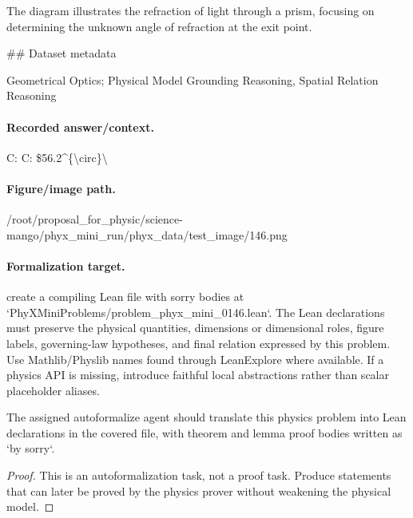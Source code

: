 The diagram illustrates the refraction of light through a prism, focusing on determining the unknown angle of refraction at the exit point.

\#\# Dataset metadata

Geometrical Optics; Physical Model Grounding Reasoning, Spatial Relation Reasoning

\paragraph{Recorded answer/context.}
C: C: \$56.2\textasciicircum{}\{\textbackslash{}circ\}\textbackslash{}

\paragraph{Figure/image path.}
/root/proposal\_for\_physic/science-mango/phyx\_mini\_run/phyx\_data/test\_image/146.png

\paragraph{Formalization target.}
create a compiling Lean file with sorry bodies at `PhyXMiniProblems/problem\_phyx\_mini\_0146.lean`. The Lean declarations must preserve the physical quantities, dimensions or dimensional roles, figure labels, governing-law hypotheses, and final relation expressed by this problem.
Use Mathlib/Physlib names found through LeanExplore where available. If a physics API is missing, introduce faithful local abstractions rather than scalar placeholder aliases.

\begin{theorem}
\label{thm:physics:phyx_mini_0146:target}
The assigned autoformalize agent should translate this physics problem into Lean declarations in the covered file, with theorem and lemma proof bodies written as `by sorry`.
\end{theorem}
\begin{proof}
This is an autoformalization task, not a proof task. Produce statements that can later be proved by the physics prover without weakening the physical model.
\end{proof}

